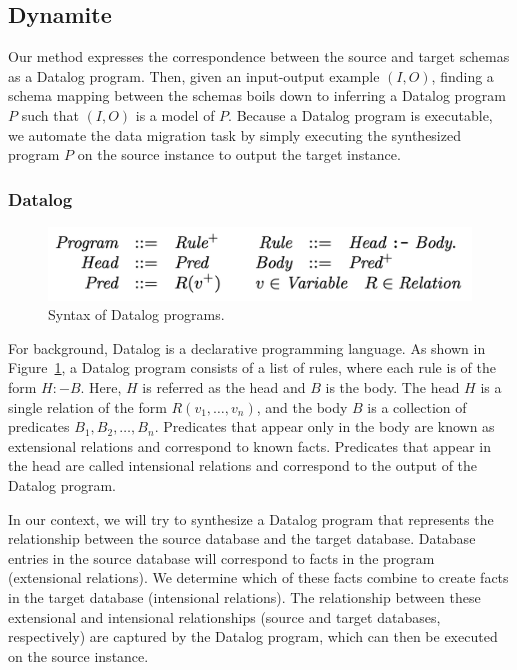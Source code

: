 \documentclass[]{article}
\begin{document}
        \subsection{Dynamite}

            Our method expresses the correspondence between the source and target schemas as a Datalog program. Then, given an input-output example $(I, O)$, finding a schema mapping between the schemas boils down to inferring a Datalog program $P$ such that $(I, O)$ is a model of $P$. Because a Datalog program is executable, we automate the data migration task by simply executing the synthesized program $P$ on the source instance to output the target instance. 

            \subsubsection{Datalog}

                \begin{figure}[]
                    \centering
                    \includegraphics[width=.7\textwidth]{datalog_syntax}
                    \caption{Syntax of Datalog programs.}
                    \label{fig:datalog_syntax}
                \end{figure}

                For background, Datalog is a declarative programming language. As shown in Figure~\ref{fig:datalog_syntax}, a Datalog program consists of a list of rules, where each rule is of the form $H :- B$. Here, $H$ is referred as the head and $B$ is the body. The head $H$ is a single relation of the form $R(v_1, \ldots, v_n)$, and the body $B$ is a collection of predicates $B_1, B_2, \ldots, B_n$. Predicates that appear only in the body are known as extensional relations and correspond to known facts. Predicates that appear in the head are called intensional relations and correspond to the output of the Datalog program. 

                In our context, we will try to synthesize a Datalog program that represents the relationship between the source database and the target database. Database entries in the source database will correspond to facts in the program (extensional relations). We determine which of these facts combine to create facts in the target database (intensional relations). The relationship between these extensional and intensional relationships (source and target databases, respectively) are captured by the Datalog program, which can then be executed on the source instance. 
\end{document}
